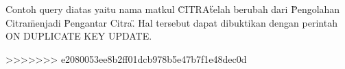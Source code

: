 	Contoh query diatas yaitu nama matkul \"CITRA\" telah berubah dari \"Pengolahan Citra\" menjadi \"Pengantar Citra\". Hal tersebut dapat dibuktikan dengan perintah ON DUPLICATE KEY UPDATE.
	
\cite{sofwan2003belajar}
\cite{kadir2010mudah}
>>>>>>> e2080053ee8b2ff01dcb978b5e47b7f1e48dec0d
